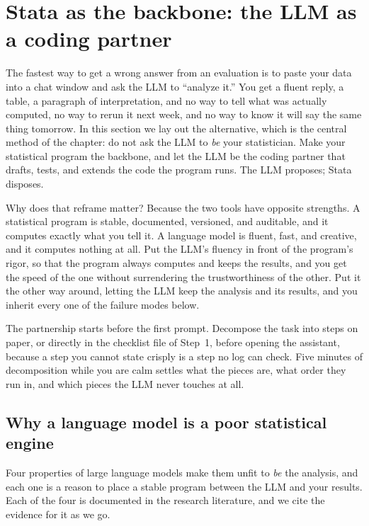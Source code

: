 \documentclass[
    a4paper,
    fontsize=10pt,
    twoside=true,
    numbers=noenddot,
]{kaobook}
\begin{document}
\section{Stata as the backbone: the LLM as a coding partner}\label{sec:backbone}
The fastest way to get a wrong answer from an evaluation is to paste your data into a chat window and ask the LLM to \enquote{analyze it.} You get a fluent reply, a table, a paragraph of interpretation, and no way to tell what was actually computed, no way to rerun it next week, and no way to know it will say the same thing tomorrow. In this section we lay out the alternative, which is the central method of the chapter: do not ask the LLM to \emph{be} your statistician. Make your statistical program the backbone, and let the LLM be the coding partner that drafts, tests, and extends the code the program runs. The LLM proposes; Stata disposes.

Why does that reframe matter? Because the two tools have opposite strengths. A statistical program is stable, documented, versioned, and auditable, and it computes exactly what you tell it. A language model is fluent, fast, and creative, and it computes nothing at all. Put the LLM's fluency in front of the program's rigor, so that the program always computes and keeps the results, and you get the speed of the one without surrendering the trustworthiness of the other. Put it the other way around, letting the LLM keep the analysis and its results, and you inherit every one of the failure modes below.

The partnership starts before the first prompt. Decompose the task into steps on paper, or directly in the checklist file of Step~1, before opening the assistant, because a step you cannot state crisply is a step no log can check. Five minutes of decomposition while you are calm settles what the pieces are, what order they run in, and which pieces the LLM never touches at all.

\subsection{Why a language model is a poor statistical engine}\label{sec:llm-limits}
Four properties of large language models make them unfit to \emph{be} the analysis, and each one is a reason to place a stable program between the LLM and your results. Each of the four is documented in the research literature, and we cite the evidence for it as we go.
\end{document}
